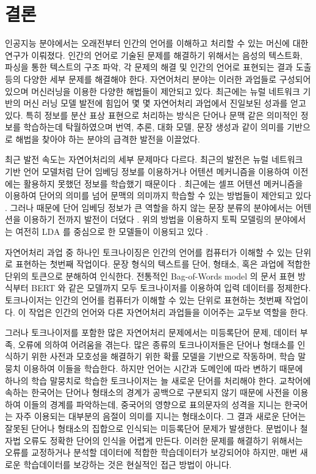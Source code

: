 \documentclass[11pt]{article}
\begin{document}
\newpage
\section{결론} \label{conclusion}

인공지능 분야에서는 오래전부터 인간의 언어를 이해하고 처리할 수 있는 머신에 대한 연구가 이뤄졌다.
인간의 언어로 기술된 문제를 해결하기 위해서는 음성의 텍스트화, 파싱을 통한 텍스트의 구조 파악, 각 문제의 해결 및 인간의 언어로 표현되는 결과 도출 등의 다양한 세부 문제를 해결해야 한다.
자연어처리 분야는 이러한 과업들로 구성되어 있으며 머신러닝을 이용한 다양한 해법들이 제안되고 있다.
최근에는 뉴럴 네트워크 기반의 머신 러닝 모델 발전에 힘입어 몇 몇 자연어처리 과업에서 진일보된 성과를 얻고 있다.
특히 정보를 분산 표상 표현으로 처리하는 방식은 단어나 문맥 같은 의미적인 정보를 학습하는데 탁월하였으며 번역, 추론, 대화 모델, 문장 생성과 같이 의미를 기반으로 해법을 찾아야 하는 분야의 급격한 발전을 이끌었다.

최근 발전 속도는 자연어처리의 세부 문제마다 다르다.
최근의 발전은 뉴럴 네트워크 기반 언어 모델처럼 단어 임베딩 정보를 이용하거나 어텐션 메커니즘을 이용하여 이전에는 활용하지 못했던 정보를 학습했기 때문이다 \citep{joulin2016bag, bahdanau2014neural, lin2017structured}.
최근에는 셀프 어텐션 메커니즘을 이용하여 단어의 의미를 넘어 문맥의 의미까지 학습할 수 있는 방법들이 제안되고 있다 \citep{vaswani2017attention, devlin2018bert}.
그러나 때문에 단어 임베딩 정보가 큰 역할을 하지 않는 문장 분류의 분야에서는 어텐션을 이용하기 전까지 발전이 더뎠다 \citep{yang2016hierarchical}.
위의 방법을 이용하지 토픽 모델링의 분야에서는 여전히 LDA \citep{blei2003latent} 를 중심으로 한 모델들이 이용되고 있다 \citep{allahyari2017brief}.

자연어처리 과업 중 하나인 토크나이징은 인간의 언어를 컴퓨터가 이해할 수 있는 단위로 표현하는 첫번째 작업이다.
문장 형식의 텍스트를 단어, 형태소, 혹은 과업에 적합한 단위의 토큰으로 분해하여 인식한다.
전통적인 Bag-of-Words model 의 문서 표현 방식부터 BERT 와 같은 모델까지 모두 토크나이저를 이용하여 입력 데이터를 정제한다.
토크나이저는 인간의 언어를 컴퓨터가 이해할 수 있는 단위로 표현하는 첫번째 작업이다.
이 작업은 인간의 언어와 다른 자연어처리 과업들을 이어주는 교두보 역할을 한다.

그러나 토크나이저를 포함한 많은 자연어처리 문제에서는 미등록단어 문제, 데이터 부족, 오류에 의하여 어려움을 겪는다.
많은 종류의 토크나이저들은 단어나 형태소를 인식하기 위한 사전과 모호성을 해결하기 위한 확률 모델을 기반으로 작동하며, 학습 말뭉치 이용하여 이들을 학습한다.
하지만 언어는 시간과 도메인에 따라 변하기 때문에 하나의 학습 말뭉치로 학습한 토크나이저는 늘 새로운 단어를 처리해야 한다.
교착어에 속하는 한국어는 단어나 형태소의 경계가 공백으로 구분되지 않기 때문에 사전을 이용하여 이들의 경계를 파악하는데, 중국어의 영향으로 표의문자의 성격을 지니는 한국어는 자주 이용되는 대부분의 음절이 의미를 지니는 형태소이다.
그 결과 새로운 단어는 잘못된 단어나 형태소의 집합으로 인식되는 미등록단어 문제가 발생한다.
문법이나 철자법 오류도 정확한 단어의 인식을 어렵게 만든다.
이러한 문제를 해결하기 위해서는 오류를 교정하거나 분석할 데이터에 적합한 학습데이터가 보강되어야 하지만, 매번 새로운 학습데이터를 보강하는 것은 현실적인 접근 방법이 아니다.
\end{document}

